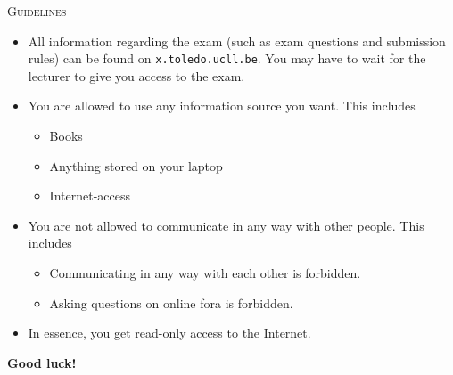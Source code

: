 \documentclass[english]{../src/ucll-exam}
\begin{document}
\begin{examguidelines}
  \begin{center}
    \textsc{\Huge Guidelines}
  \end{center}
  \vskip4mm
  \large
  \begin{itemize}
    \item All information regarding the exam (such as exam questions and submission rules)
          can be found on \texttt{x.toledo.ucll.be}.
          You may have to wait for the lecturer to give you access to the exam.
    \item You are allowed to use any information source you want. This includes
          \begin{itemize}
            \item Books
            \item Anything stored on your laptop
            \item Internet-access
          \end{itemize}
    \item You are not allowed to communicate in any way with other people. This includes
          \begin{itemize}
            \item Communicating in any way with each other is forbidden.
            \item Asking questions on online fora is forbidden.
          \end{itemize}
    \item In essence, you get read-only access to the Internet.
  \end{itemize}

  \begin{center} \bfseries\Large
    Good luck!
  \end{center}
\end{examguidelines}
\end{document}
